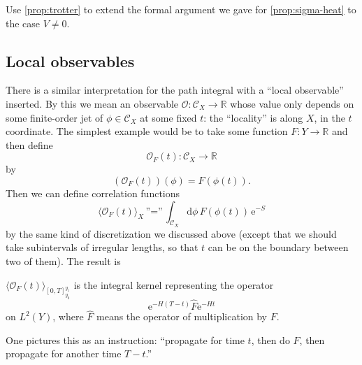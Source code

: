 \documentclass[12pt,letterpaper,reqno]{article}
\numberwithin{equation}{section}
\newcommand{\cC}{\ensuremath{\mathcal C}}
\newcommand{\cO}{\ensuremath{\mathcal O}}
\newcommand{\R}{\ensuremath{\mathbb R}}
\newcommand{\e}{{\mathrm e}}
\newcommand{\de}{\mathrm{d}}
\newcommand{\IP}[1]{\langle#1\rangle}
\newcommand{\ket}[1]{\lvert#1\rangle}
\newcommand{\insfig}[2]{

\medskip
\noindent
\begin{minipage}{\linewidth}
\makebox[\linewidth]{\texttt{[image: figures/\#1-crop.pdf]}}
\end{minipage}
\noindent}
\newcommand{\fixme}[1]{{\color{orange}{[#1]}}}
\begin{document}
\begin{exercise} Use \autoref{prop:trotter}
to extend the formal argument we gave for \autoref{prop:sigma-heat}
to the case $V \neq 0$.
\end{exercise}



\subsection{Local observables}

There is a similar interpretation for the path
integral with a ``local observable'' inserted. By this
we mean an observable $\cO: \cC_X \to \R$ whose value 
only depends on some finite-order jet of $\phi \in \cC_X$
at some fixed $t$: the ``locality'' is along $X$, in the $t$ coordinate. 
The simplest example would be to take
some function $F: Y \to \R$ and then define
\begin{equation}
  \cO_F(t): \cC_X \to \R
\end{equation}
by
\begin{equation}
  (\cO_F(t)) (\phi) = F(\phi(t)).
\end{equation}
Then we can define correlation functions
\begin{equation}
  \IP{\cO_F(t)}_X \, \text{''=''} \, \int_{\cC_{X}} \de \phi \, F(\phi(t)) \, \e^{-S}
\end{equation}
by the same kind of discretization we discussed above
(except that we should take subintervals of irregular
lengths, so that $t$ can be on the boundary between two
of them).
The result is \fixme{ref?}
\begin{prop} \label{prop:1d-discretization-with-insertion}
  $\IP{\cO_F(t)}_{[0,T]^{y_1}_{y_0}}$ is the integral kernel
  representing the operator 
  \begin{equation}
    \e^{-H(T-t)} \hat F \e^{-Ht}
  \end{equation}
  on $L^2(Y)$, where $\hat F$ means the operator of multiplication
  by $F$.
\end{prop}
One pictures this as an instruction: 
``propagate for time $t$, then do
$F$, then propagate for another time $T-t$.''
\insfig{qft-geometry-18}{1.0}
\end{document}
